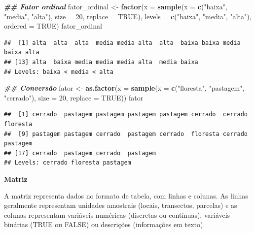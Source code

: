 \documentclass[
]{article}
\newenvironment{Shaded}{\begin{snugshade}}{\end{snugshade}}
\newcommand{\AttributeTok}[1]{\textcolor[rgb]{0.13,0.29,0.53}{#1}}
\newcommand{\ConstantTok}[1]{\textcolor[rgb]{0.56,0.35,0.01}{#1}}
\newcommand{\DecValTok}[1]{\textcolor[rgb]{0.00,0.00,0.81}{#1}}
\newcommand{\DocumentationTok}[1]{\textcolor[rgb]{0.56,0.35,0.01}{\textbf{\textit{#1}}}}
\newcommand{\FunctionTok}[1]{\textcolor[rgb]{0.13,0.29,0.53}{\textbf{#1}}}
\newcommand{\NormalTok}[1]{#1}
\newcommand{\OtherTok}[1]{\textcolor[rgb]{0.56,0.35,0.01}{#1}}
\newcommand{\StringTok}[1]{\textcolor[rgb]{0.31,0.60,0.02}{#1}}
\begin{document}
\begin{Shaded}
\begin{Highlighting}[]
\DocumentationTok{\#\# Fator ordinal}
\NormalTok{fator\_ordinal }\OtherTok{\textless{}{-}} \FunctionTok{factor}\NormalTok{(}\AttributeTok{x =} \FunctionTok{sample}\NormalTok{(}\AttributeTok{x =} \FunctionTok{c}\NormalTok{(}\StringTok{"baixa"}\NormalTok{, }\StringTok{"media"}\NormalTok{, }\StringTok{"alta"}\NormalTok{), }
                                   \AttributeTok{size =} \DecValTok{20}\NormalTok{, }\AttributeTok{replace =} \ConstantTok{TRUE}\NormalTok{),}
                        \AttributeTok{levels =} \FunctionTok{c}\NormalTok{(}\StringTok{"baixa"}\NormalTok{, }\StringTok{"media"}\NormalTok{, }\StringTok{"alta"}\NormalTok{), }\AttributeTok{ordered =} \ConstantTok{TRUE}\NormalTok{)}
\NormalTok{fator\_ordinal}
\end{Highlighting}
\end{Shaded}

\begin{verbatim}
##  [1] alta  alta  alta  media media alta  alta  baixa baixa media baixa alta 
## [13] alta  baixa media media media alta  media baixa
## Levels: baixa < media < alta
\end{verbatim}

\begin{Shaded}
\begin{Highlighting}[]
\DocumentationTok{\#\# Conversão}
\NormalTok{fator }\OtherTok{\textless{}{-}} \FunctionTok{as.factor}\NormalTok{(}\AttributeTok{x =} \FunctionTok{sample}\NormalTok{(}\AttributeTok{x =} \FunctionTok{c}\NormalTok{(}\StringTok{"floresta"}\NormalTok{, }\StringTok{"pastagem"}\NormalTok{, }\StringTok{"cerrado"}\NormalTok{), }
                              \AttributeTok{size =} \DecValTok{20}\NormalTok{, }\AttributeTok{replace =} \ConstantTok{TRUE}\NormalTok{))}
\NormalTok{fator}
\end{Highlighting}
\end{Shaded}

\begin{verbatim}
##  [1] cerrado  pastagem pastagem pastagem pastagem cerrado  cerrado  floresta
##  [9] pastagem pastagem cerrado  pastagem cerrado  floresta cerrado  pastagem
## [17] cerrado  pastagem cerrado  pastagem
## Levels: cerrado floresta pastagem
\end{verbatim}

\textbf{Matriz}

A matriz representa dados no formato de tabela, com linhas e colunas. As linhas geralmente representam unidades amostrais (locais, transectos, parcelas) e as colunas representam variáveis numéricas (discretas ou contínuas), variáveis binárias (TRUE ou FALSE) ou descrições (informações em texto).
\end{document}
